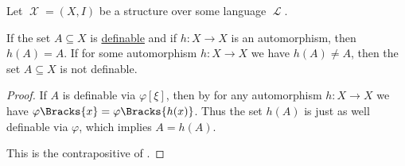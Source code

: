 \begin{corollary}\label{thm:automorphism_of_definable_set}
  Let \( \mscrX = (X, I) \) be a structure over some language \( \mscrL \).

  \begin{thmenum}
     If the set \( A \subseteq X \) is \hyperref[def:first_order_definability]{definable} and if \( h: X \to X \) is an automorphism, then \( h(A) = A \).
     If for some automorphism \( h: X \to X \) we have \( h(A) \neq A \), then the set \( A \subseteq X \) is not definable.
  \end{thmenum}
\end{corollary}
\begin{proof}
   If \( A \) is definable via \( \varphi[\xi] \), then by  for any automorphism \( h: X \to X \) we have \( \varphi\Bracks{x} = \varphi\Bracks{h(x)} \). Thus the set \( h(A) \) is just as well definable via \( \varphi \), which implies \( A = h(A) \).

   This is the contrapositive of .
\end{proof}
